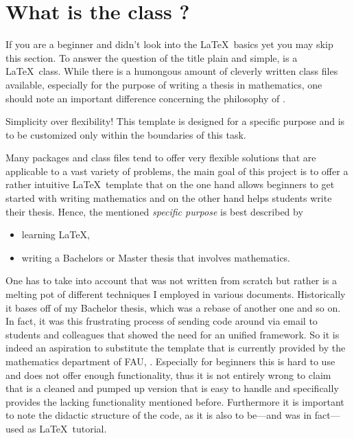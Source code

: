 \section{What is the class \texttt{\classname}?}
If you are a beginner and didn't look into the \LaTeX\ basics yet you may skip this section. 
To answer the question of the title plain and simple, \texttt{\classname} is a \LaTeX\ class.
While there is a humongous amount of cleverly written class files available, 
especially for the purpose of writing a thesis in mathematics, one should note an 
important difference concerning the philosophy of \texttt{\classname}.
\begin{emphBox}
Simplicity over flexibility! This template is designed for a specific purpose and is 
to be customized only within the boundaries of this task.
\end{emphBox}
Many packages and class files \cite{refLatex} tend to offer very flexible solutions that 
are applicable to a vast variety of problems, the main goal of this project is to offer a 
rather intuitive \LaTeX\ template that on the one hand allows beginners to get started 
with writing mathematics and on the other hand helps students write their thesis. 
Hence, the mentioned \textit{specific purpose} is best described by
\begin{itemize}
\item learning \LaTeX,
\item writing a Bachelors or Master thesis that involves mathematics.
\end{itemize}
One has to take into account that \texttt{\classname} was not written from scratch but rather 
is a melting pot of different techniques I employed in various documents. 
Historically it bases off of my Bachelor thesis, which was a rebase of another one and so on. 
In fact, it was this frustrating process of sending code around via email to students and 
colleagues that showed the need for an unified framework. So it is indeed an aspiration 
to substitute the template that is currently provided by the mathematics department of 
FAU, \cite{l}. Especially for beginners this is hard to use and does not 
offer enough functionality, thus it is not entirely wrong to claim that \texttt{\classname} 
is a cleaned and pumped up version that is easy to handle and specifically provides 
the lacking functionality mentioned before. Furthermore it is important to note 
the didactic structure of the code, as it is also to be---and was in fact---used as \LaTeX\ 
tutorial. 
